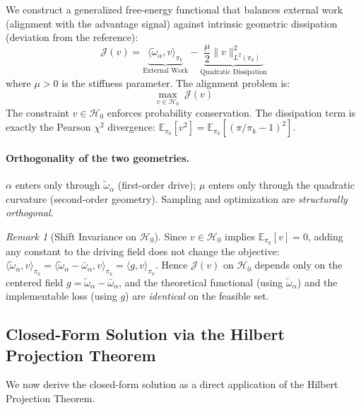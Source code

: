 \documentclass[11pt]{article}
\theoremstyle{definition}
\theoremstyle{remark}
\newtheorem{remark}[theorem]{Remark}
\newcommand{\E}{\mathbb{E}}
\newcommand{\pik}{\pi_k}
\begin{document}
We construct a generalized free-energy functional that balances external work (alignment with the advantage signal) against intrinsic geometric dissipation (deviation from the reference):
\begin{equation}
\label{eq:opo_functional}
\mathcal{J}(v) = \underbrace{\langle \tilde{\omega}_\alpha, v\rangle_{\pik}}_{\text{External Work}} - \underbrace{\frac{\mu}{2}\|v\|_{L^2(\pik)}^2}_{\text{Quadratic Dissipation}}
\end{equation}
where $\mu > 0$ is the stiffness parameter. The alignment problem is:
\begin{equation}
\label{eq:opo_ratio}
\max_{v \in \mathcal{H}_0} \; \mathcal{J}(v)
\end{equation}
The constraint $v \in \mathcal{H}_0$ enforces probability conservation. The dissipation term is exactly the Pearson $\chi^2$ divergence:
$\E_{\pik}[v^2] = \E_{\pik}[(\pi/\pik-1)^2]$.

\paragraph{Orthogonality of the two geometries.}
$\alpha$ enters only through $\tilde{\omega}_\alpha$ (first-order drive);
$\mu$ enters only through the quadratic curvature (second-order geometry).
Sampling and optimization are \emph{structurally orthogonal}.

\begin{remark}[Shift Invariance on $\mathcal{H}_0$]
\label{rem:shift_invariance}
Since $v \in \mathcal{H}_0$ implies $\E_{\pik}[v] = 0$, adding any constant to the driving field does not change the objective:
$\langle \tilde{\omega}_\alpha, v \rangle_{\pik} = \langle \tilde{\omega}_\alpha - \bar{\omega}_\alpha, v \rangle_{\pik} = \langle g, v \rangle_{\pik}$.
Hence $\mathcal{J}(v)$ on $\mathcal{H}_0$ depends only on the centered field $g = \tilde{\omega}_\alpha - \bar{\omega}_\alpha$, and the theoretical functional (using $\tilde{\omega}_\alpha$) and the implementable loss (using $g$) are \emph{identical} on the feasible set.
\end{remark}

\subsection{Closed-Form Solution via the Hilbert Projection Theorem}
\label{subsec:projection}

We now derive the closed-form solution as a direct application of the Hilbert Projection Theorem.
\end{document}
